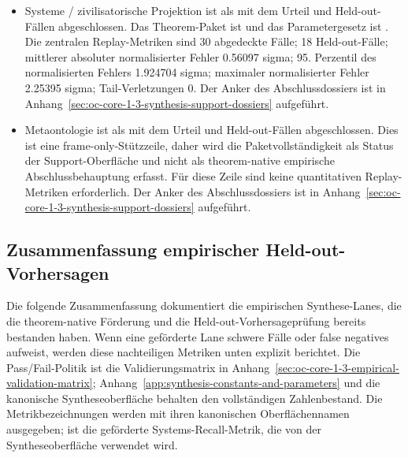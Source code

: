 \begin{itemize}[leftmargin=1.6em,nosep]
\item Systeme / zivilisatorische Projektion ist als  mit dem Urteil  und  Held-out-Fällen abgeschlossen. Das Theorem-Paket ist  und das Parametergesetz ist . Die zentralen Replay-Metriken sind 30 abgedeckte Fälle; 18 Held-out-Fälle; mittlerer absoluter normalisierter Fehler 0.56097 sigma; 95. Perzentil des normalisierten Fehlers 1.924704 sigma; maximaler normalisierter Fehler 2.25395 sigma; Tail-Verletzungen 0. Der Anker des Abschlussdossiers ist in Anhang~\ref{sec:oc-core-1-3-synthesis-support-dossiers} aufgeführt.
\item Metaontologie ist als  mit dem Urteil  und  Held-out-Fällen abgeschlossen. Dies ist eine frame-only-Stützzeile, daher wird die Paketvollständigkeit als Status der Support-Oberfläche und nicht als theorem-native empirische Abschlussbehauptung erfasst. Für diese Zeile sind keine quantitativen Replay-Metriken erforderlich. Der Anker des Abschlussdossiers ist in Anhang~\ref{sec:oc-core-1-3-synthesis-support-dossiers} aufgeführt.
\end{itemize}

\subsection{Zusammenfassung empirischer Held-out-Vorhersagen}
Die folgende Zusammenfassung dokumentiert die empirischen Synthese-Lanes, die die theorem-native Förderung und die Held-out-Vorhersageprüfung bereits bestanden haben.
Wenn eine geförderte Lane schwere Fälle oder false negatives aufweist, werden diese nachteiligen Metriken unten explizit berichtet. Die Pass/Fail-Politik ist die Validierungsmatrix in Anhang~\ref{sec:oc-core-1-3-empirical-validation-matrix}; Anhang~\ref{app:synthesis-constants-and-parameters} und die kanonische Syntheseoberfläche behalten den vollständigen Zahlenbestand.
Die Metrikbezeichnungen werden mit ihren kanonischen Oberflächennamen ausgegeben;  ist die geförderte Systems-Recall-Metrik, die von der Syntheseoberfläche verwendet wird.


